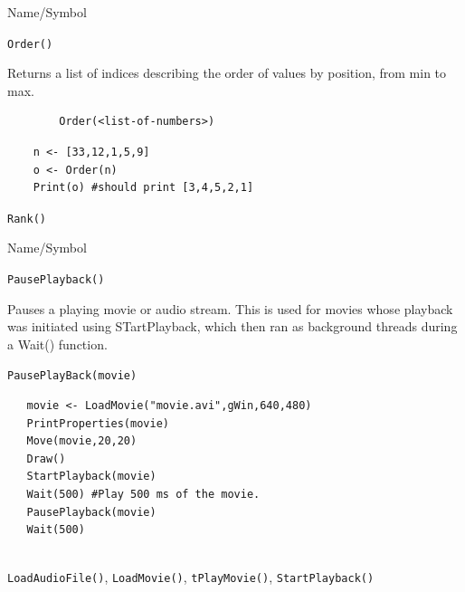 \begin{desc}{Name/Symbol}
\item[Name/Symbol]	\verb+Order()+

\item[Description]	Returns a list of indices describing the order of values by position, from min to max. 

\item[Usage]
\begin{verbatim}
		Order(<list-of-numbers>)
\end{verbatim}

\item[Example]	
\begin{verbatim}
	n <- [33,12,1,5,9]
  	o <- Order(n)
    Print(o) #should print [3,4,5,2,1]
\end{verbatim}

\item[See Also]	\verb+Rank()+
\end{desc}

\vfill
\newpage
{}
\vfill

\begin{desc}{Name/Symbol}
\item[Name/Symbol]	\verb+PausePlayback()+
 
\item[Description] Pauses a playing movie or audio stream.  This is used for 
movies whose playback was initiated using STartPlayback, which then ran as
background threads during a Wait() function. 

\item[Usage]		
\begin{verbatim}
PausePlayBack(movie)
\end{verbatim}

\item[Example]	
\begin{verbatim}
   movie <- LoadMovie("movie.avi",gWin,640,480)
   PrintProperties(movie)
   Move(movie,20,20)
   Draw() 
   StartPlayback(movie)
   Wait(500) #Play 500 ms of the movie.
   PausePlayback(movie)
   Wait(500)
   
\end{verbatim}

\item[See Also] \verb+LoadAudioFile()+, \verb+LoadMovie()+, \verb+tPlayMovie()+, \verb+StartPlayback()+
\end{desc}




